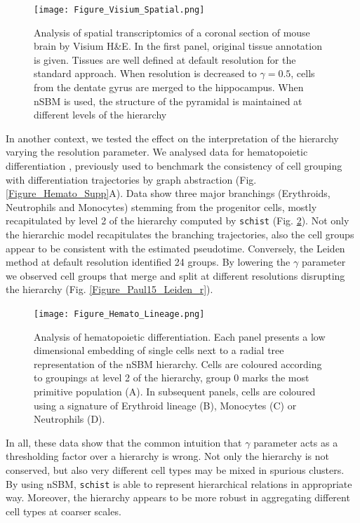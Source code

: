 \documentclass[10pt]{article}
\begin{document}
\begin{figure}[H]
\centering
\texttt{[image: Figure\_Visium\_Spatial.png]}
\caption[]{Analysis of spatial transcriptomics of a coronal section of mouse brain by Visium H\&E. In the first panel, original tissue annotation is given. Tissues are well defined at default resolution for the standard approach. When resolution is decreased to $\gamma = 0.5$, cells from the dentate gyrus are merged to the hippocampus. When nSBM is used, the structure of the pyramidal is maintained at different levels of the hierarchy}\label{Figure_Visium}
\end{figure}

In another context, we tested the effect on the interpretation of the hierarchy varying the resolution parameter. We analysed data for hematopoietic differentiation \cite{paul_2015}, previously used to benchmark the consistency of cell grouping with differentiation trajectories by graph abstraction \cite{wolf_2019} (Fig. \ref{Figure_Hemato_Supp}A). Data show three major branchings (Erythroids, Neutrophils and Monocytes) stemming from the progenitor cells, mostly recapitulated by level 2 of the hierarchy computed by \texttt{schist} (Fig. \ref{Figure_Hemato_Lineage}). Not only the hierarchic model recapitulates the branching trajectories, also the cell groups appear to be consistent with the estimated pseudotime. Conversely, the Leiden method at default resolution identified 24 groups. By lowering the $\gamma$ parameter we observed cell groups that merge and split at different resolutions disrupting the hierarchy (Fig. \ref{Figure_Paul15_Leiden_r}). 


\begin{figure}[H]
\centering
\texttt{[image: Figure\_Hemato\_Lineage.png]}
\caption[]{Analysis of hematopoietic differentiation. Each panel presents a low dimensional embedding of single cells next to a radial tree representation of the nSBM hierarchy. Cells are coloured according to groupings at level 2 of the hierarchy, group 0 marks the most primitive population (A). In subsequent panels, cells are coloured using a signature of Erythroid lineage (B), Monocytes (C) or Neutrophils (D).}\label{Figure_Hemato_Lineage}
\end{figure}

In all, these data show that the common intuition that $\gamma$ parameter acts as a thresholding factor over a hierarchy is wrong. Not only the hierarchy is not conserved, but also very different cell types may be mixed in spurious clusters. By using nSBM, \texttt{schist} is able to represent hierarchical relations in appropriate way. Moreover, the hierarchy appears to be more robust in aggregating different cell types at coarser scales.
\end{document}
